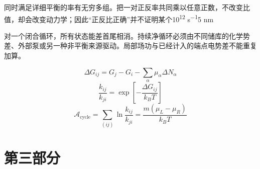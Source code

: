 \documentclass[11pt,a4paper]{article}
\begin{document}
{\cjkfont 同时满足详细平衡的率有无穷多组。把一对正反率共同乘以任意正数，不改变比值，却会改变动力学；因此“正反比正确”并不证明某个}\allowbreak{}10\textsuperscript{12} s\textsuperscript{−1}\allowbreak{}5 nm\allowbreak{}
\par
{\cjkfont 对一个闭合循环，所有状态能差首尾相消。持续净循环必须由不同储库的化学势差、外部泵或另一种非平衡来源驱动。局部场功与已经计入的端点电势差不能重复加算。}\allowbreak{}
\par
\begin{equation}
\Delta G_{ij}=G_j-G_i-\sum_\alpha\mu_\alpha\Delta N_\alpha
\label{eq:21}\end{equation}
\begin{equation}
\frac{k_{ij}}{k_{ji}}=\exp\!\left[-\frac{\Delta G_{ij}}{k_BT}\right]
\label{eq:22}\end{equation}
\begin{equation}
\mathcal{A}_{\mathrm{cycle}}=\sum_{(ij)}\ln\frac{k_{ij}}{k_{ji}}=\frac{m(\mu_L-\mu_R)}{k_BT}
\label{eq:23}\end{equation}
\medskip
\clearpage
\part*{{\cjkfont 第三部分}\allowbreak{} \allowbreak{}}
\FloatBarrier
\Needspace{110pt}
\end{document}
